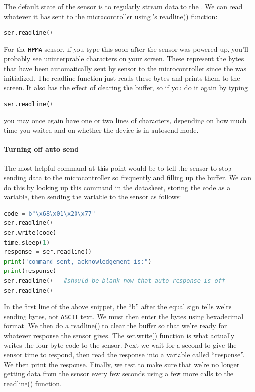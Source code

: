 The default state of the sensor is to regularly stream data to the \uart.
We can read whatever it has sent to the microcontroller using \Micropython's readline() function: 

\begin{lstlisting}[language=Python]
ser.readline()
\end{lstlisting}

For the \texttt{HPMA} sensor, if you type this soon after the sensor was powered up, you’ll probably see uninterprable characters on your screen.
These represent the bytes that have been automatically sent by sensor to the microcontroller since the \uart was initialized.
The readline function just reads these bytes and prints them to the screen. It also has the effect of clearing the buffer, so if you do it again by typing

\begin{lstlisting}[language=Python]
ser.readline()
\end{lstlisting}

you may once again have one or two lines of characters, depending on how much time you waited and on whether the device is in autosend mode.

\paragraph{Turning off auto send}
The most helpful command at this point would be to tell the sensor to stop sending data to the microcontroller so frequently and filling up the \uart buffer.
We can do this by looking up this command in the datasheet, storing the code as a variable, then sending the variable to the sensor as follows:

\begin{lstlisting}[language=Python]
code = b"\x68\x01\x20\x77"
ser.readline()
ser.write(code)
time.sleep(1)
response = ser.readline()
print("command sent, acknowledgement is:")
print(response)
ser.readline()   #should be blank now that auto response is off
ser.readline()
\end{lstlisting}

In the first line of the above snippet, the “b” after the equal sign tells \Micropython we’re sending bytes, not \texttt{ASCII} text.
We must then enter the bytes using hexadecimal format.  We then do a readline() to clear the buffer so that we’re ready for whatever response the sensor gives.
The ser.write() function is what actually writes the four byte code to the sensor.
Next we wait for a second to give the sensor time to respond, then read the response into a variable called “response”.
We then print the response.  Finally, we test to make sure that we’re no longer getting data from the sensor every few seconds using a few more calls to the readline() function.

